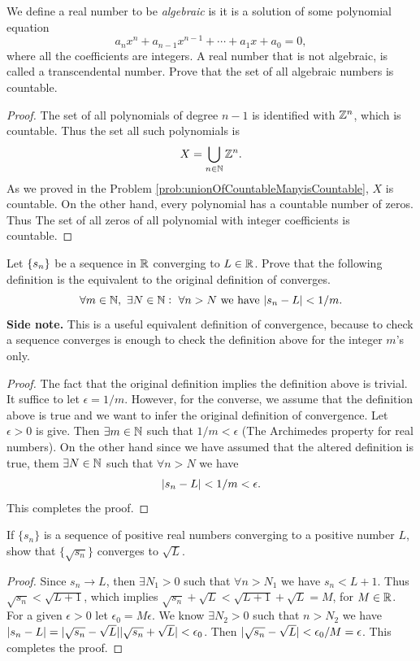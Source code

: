 \begin{problem}
	We define a real number to be \emph{algebraic} is it is a solution of some polynomial equation
	\[ a_n x^n + a_{n-1}x^{n-1} + \cdots + a_1 x + a_0 = 0, \]
	where all the coefficients are integers. A real number that is not algebraic, is called a transcendental number. Prove that the set of all algebraic numbers is countable.
\end{problem}

\begin{proof}
	The set of all polynomials of degree $n-1$ is identified with $\mathbb{Z}^{n}$, which is countable. Thus the set all such polynomials is 
	\[  X = \bigcup_{n\in\mathbb{N}} \mathbb{Z}^{n}.\]
	As we proved in the Problem \autoref{prob:unionOfCountableManyisCountable}, $X$ is countable. On the other hand, every polynomial has a countable number of zeros. Thus The set of all zeros of all polynomial with integer coefficients is countable.
\end{proof}

\begin{problem}
	Let $\{s_n\}$ be a sequence in $\mathbb{R}$ converging to $L \in \mathbb{R}$. Prove that the following definition is the equivalent to the original definition of converges.
	\[ \forall m \in \mathbb{N},\ \exists N\in\mathbb{N}:\ \forall n> N \ \text{we have}\  |s_n - L| < 1/m.  \]
	\textbf{Side note.} This is a useful equivalent definition of convergence, because to check a sequence converges is enough to check the definition above for the integer $m$'s only.
\end{problem}
\begin{proof}
	The fact that the original definition implies the definition above is trivial. It suffice to let $\epsilon = 1/m$. However, for the converse, we assume that the definition above is true and we want to infer the original definition of convergence. Let $\epsilon>0$ is give. Then $\exists m \in \mathbb{N}$ such that $1/m < \epsilon$ (The Archimedes property for real numbers). On the other hand since we have assumed that the altered definition is true, them $\exists N \in \mathbb{N}$ such that $\forall n >N$ we have
	\[ |s_n - L| < 1/m < \epsilon. \]
	This completes the proof.
\end{proof}


\begin{problem}
	If $\{s_n\}$ is a sequence of positive real numbers converging to a positive number $L$, show that $\{\sqrt{s_n}\}$ converges to $\sqrt{L}$.
\end{problem}
\begin{proof}
	Since $s_n \to L$, then $\exists N_1 > 0$ such that $\forall n > N_1$ we have $s_n < L+1$. Thus $\sqrt{s_n}<\sqrt{L+1}$, which implies $\sqrt{s_n} + \sqrt{L} < \sqrt{L+1} + \sqrt{L} = M$, for $M \in \mathbb{R}$. For a given $\epsilon>0$ let $\epsilon_0 = M \epsilon$. We know $\exists N_2>0$ such that $n>N_2$ we have $|s_n - L| = |\sqrt{s_n} - \sqrt{L}| |\sqrt{s_n}+\sqrt{L}| < \epsilon_0$. Then $|\sqrt{s_n} - \sqrt{L}| < \epsilon_0 /M = \epsilon $. This completes the proof.
\end{proof}


